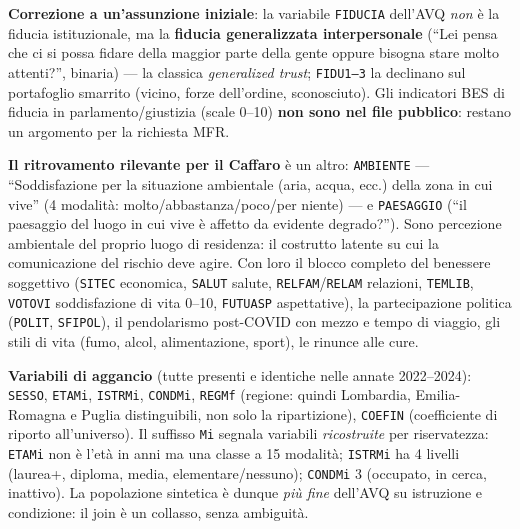 \documentclass[11pt,a4paper]{article}
\newcommand{\code}[1]{\texttt{#1}}
\begin{document}
\medskip\noindent\textbf{Correzione a un'assunzione iniziale}: la
variabile \code{FIDUCIA} dell'AVQ \emph{non} \`e la fiducia
istituzionale, ma la \textbf{fiducia generalizzata interpersonale}
(``Lei pensa che ci si possa fidare della maggior parte della gente
oppure bisogna stare molto attenti?'', binaria) --- la classica
\emph{generalized trust}; \code{FIDU1--3} la declinano sul portafoglio
smarrito (vicino, forze dell'ordine, sconosciuto). Gli indicatori BES di
fiducia in parlamento/giustizia (scale 0--10) \textbf{non sono nel file
pubblico}: restano un argomento per la richiesta MFR.

\medskip\noindent\textbf{Il ritrovamento rilevante per il Caffaro} \`e
un altro: \code{AMBIENTE} --- ``Soddisfazione per la situazione
ambientale (aria, acqua, ecc.) della zona in cui vive'' (4 modalit\`a:
molto/abbastanza/poco/per niente) --- e \code{PAESAGGIO} (``il paesaggio
del luogo in cui vive \`e affetto da evidente degrado?''). Sono
percezione ambientale del proprio luogo di residenza: il costrutto
latente su cui la comunicazione del rischio deve agire. Con loro il
blocco completo del benessere soggettivo (\code{SITEC} economica,
\code{SALUT} salute, \code{RELFAM}/\code{RELAM} relazioni,
\code{TEMLIB}, \code{VOTOVI} soddisfazione di vita 0--10,
\code{FUTUASP} aspettative), la partecipazione politica
(\code{POLIT}, \code{SFIPOL}), il pendolarismo post-COVID con mezzo e
tempo di viaggio, gli stili di vita (fumo, alcol, alimentazione,
sport), le rinunce alle cure.

\medskip\noindent\textbf{Variabili di aggancio} (tutte presenti e
identiche nelle annate 2022--2024): \code{SESSO}, \code{ETAMi},
\code{ISTRMi}, \code{CONDMi}, \code{REGMf} (regione: quindi Lombardia,
Emilia-Romagna e Puglia distinguibili, non solo la ripartizione),
\code{COEFIN} (coefficiente di riporto all'universo). Il suffisso
\code{Mi} segnala variabili \emph{ricostruite} per riservatezza:
\code{ETAMi} non \`e l'et\`a in anni ma una classe a 15 modalit\`a;
\code{ISTRMi} ha 4 livelli (laurea+, diploma, media,
elementare/nessuno); \code{CONDMi} 3 (occupato, in cerca, inattivo).
La popolazione sintetica \`e dunque \emph{pi\`u fine} dell'AVQ su
istruzione e condizione: il join \`e un collasso, senza ambiguit\`a.
\end{document}
